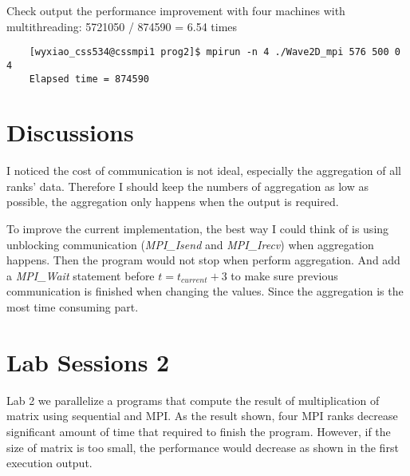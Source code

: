 \documentclass[11pt, letterpaper]{article}
\begin{document}
	\noindent \large Check output the performance improvement with four machines with multithreading: 5721050 / 874590 = 6.54 times
	\vspace{-0.2in}
	\begin{lstlisting}
	[wyxiao_css534@cssmpi1 prog2]$ mpirun -n 4 ./Wave2D_mpi 576 500 0 4
	Elapsed time = 874590
	\end{lstlisting}
	
	\section {Discussions}
	I noticed the cost of communication is not ideal, especially the aggregation of all ranks' data. Therefore I should keep the numbers of aggregation as low as possible, the aggregation only happens when the output is required.\par
	To improve the current implementation, the best way I could think of is using unblocking communication (\textit{MPI\_Isend} and \textit{MPI\_Irecv}) when aggregation happens. Then the program would not stop when perform aggregation. And add a \textit{MPI\_Wait} statement before $t = t_{current}+3$ to make sure previous communication is finished when changing the values. Since the aggregation is the most time consuming part.
	
	\section {Lab Sessions 2}
	Lab 2 we parallelize a programs that compute the result of multiplication of matrix using sequential and MPI. As the result shown, four MPI ranks decrease significant amount of time that required to finish the program. However, if the size of matrix is too small, the performance would decrease as shown in the first execution output.
	
\end{document}
